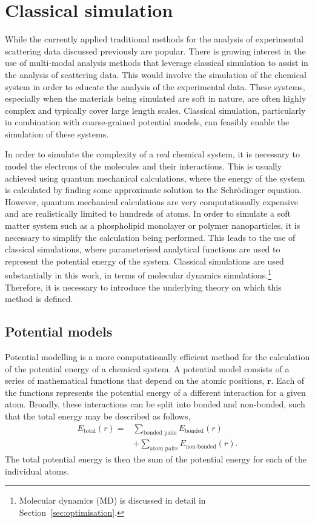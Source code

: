 \section{Classical simulation}
\label{sec:classical}
While the currently applied traditional methods for the analysis of experimental scattering data discussed previously are popular.
There is growing interest in the use of multi-modal analysis methods that leverage classical simulation to assist in the analysis of scattering data.\autocite{ivanovic_temperature-dependent_2018,scoppola_combining_2018,dabkowska_modulation_2014,hub_interpreting_2018}
This would involve the simulation of the chemical system in order to educate the analysis of the experimental data.
These systems, especially when the materials being simulated are soft in nature, are often highly complex and typically cover large length scales.
Classical simulation, particularly in combination with coarse-grained potential models, can feasibly enable the simulation of these systems.

In order to simulate the complexity of a real chemical system, it is necessary to model the electrons of the molecules and their interactions.
This is usually achieved using quantum mechanical calculations, where the energy of the system is calculated by finding some approximate solution to the Schr\"{o}dinger equation.
However, quantum mechanical calculations are very computationally expensive and are realistically limited to hundreds of atoms.
In order to simulate a soft matter system such as a phospholipid monolayer or polymer nanoparticles, it is necessary to simplify the calculation being performed.
This leads to the use of classical simulations, where parameterised analytical functions are used to represent the potential energy of the system.
Classical simulations are used substantially in this work, in terms of molecular dynamics simulations.\footnote{Molecular dynamics (MD) is discussed in detail in Section~\ref{sec:optimisation}.}
Therefore, it is necessary to introduce the underlying theory on which this method is defined.

\subsection{Potential models}
\label{sec:potentmodels}
Potential modelling is a more computationally efficient method for the calculation of the potential energy of a chemical system.
A potential model consists of a series of mathematical functions that depend on the atomic positions, $\mathbf{r}$.
Each of the functions represents the potential energy of a different interaction for a given atom.
Broadly, these interactions can be split into bonded and non-bonded, such that the total energy may be described as follows,
%
\begin{equation}
\begin{aligned}
  E_{\text{total}}(r) = & \sum_{\text{bonded pairs}}{E_{\text{bonded}}(r)} \\
  & + \sum_{\text{atom pairs}}{E_{\text{non-bonded}}(r)}.
\end{aligned}
\end{equation}
%
The total potential energy is then the sum of the potential energy for each of the individual atoms.

